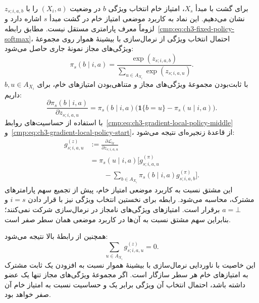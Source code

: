 برای گشت با مبدأ $X_s$، امتیاز خام انتخاب
ویژگی $b$ در وضعیت $(X_i,a)$ را با
$z_{s;i,a,b}$ نشان می‌دهیم. این نماد به
کاربرد موضعی امتیاز خام در گشت مبدأ $s$
اشاره دارد و لزوماً معرف پارامتری مستقل نیست.
مطابق رابطه~\eqref{cmp:eq:ch3-fixed-policy-softmax}،
احتمال انتخاب ویژگی از نرمال‌سازی با بیشینهٔ
هموار روی مجموعهٔ ویژگی‌های مجاز نمونهٔ جاری
حاصل می‌شود:
\[
\pi_s(b\mid i,a)=
\frac{\exp(z_{s;i,a,b})}
{\sum_{u\in A_{X_i}}\exp(z_{s;i,a,u})}.
\]
با ثابت‌بودن مجموعهٔ ویژگی‌های مجاز و
متناهی‌بودن امتیازهای خام، برای
$b,u\in A_{X_i}$ داریم:
\begin{equation}\label{cmp:eq:ch3-gradient-masked-softmax}
\frac{\partial\pi_s(b\mid i,a)}
{\partial z_{s;i,a,u}}
=\pi_s(b\mid i,a)
\bigl(\mathbf1\{b=u\}-\pi_s(u\mid i,a)\bigr).
\end{equation}
با استفاده از حساسیت‌های
روابط~\eqref{cmp:eq:ch3-gradient-local-policy-middle}
و~\eqref{cmp:eq:ch3-gradient-local-policy-start}،
از قاعدهٔ زنجیره‌ای نتیجه می‌شود:
\begin{equation}\label{cmp:eq:ch3-gradient-local-score}
\boxed{\begin{aligned}
g_{s;i,a,u}^{(z)}
&:=\frac{\partial\mathcal L_{\mathrm{tr}}}
{\partial z_{s;i,a,u}}\\
&=\pi_s(u\mid i,a)\Bigg[
g_{s;i,a,u}^{(\pi)}\\
&\qquad-\sum_{b\in A_{X_i}}
\pi_s(b\mid i,a)g_{s;i,a,b}^{(\pi)}
\Bigg].
\end{aligned}}
\end{equation}
این مشتق نسبت به کاربرد موضعی امتیاز خام،
پیش از تجمیع سهم پارامترهای مشترک، محاسبه
می‌شود. رابطه برای نخستین انتخاب ویژگی
نیز با قرار دادن $i=s$ و $a=\bot$ برقرار است.
امتیازهای ویژگی‌های نامجاز در نرمال‌سازی
شرکت نمی‌کنند؛ بنابراین سهم مشتق نسبت به
آن‌ها در کاربرد موضعی همان سطر صفر است.

همچنین از رابطهٔ بالا نتیجه می‌شود:
\begin{equation}\label{cmp:eq:ch3-gradient-local-score-zero-sum}
\boxed{\sum_{u\in A_{X_i}}g_{s;i,a,u}^{(z)}=0.}
\end{equation}
این خاصیت با ناوردایی نرمال‌سازی با بیشینهٔ
هموار نسبت به افزودن یک ثابت مشترک به
امتیازهای خام هر سطر سازگار است. اگر مجموعهٔ
ویژگی‌های مجاز تنها یک عضو داشته باشد،
احتمال انتخاب آن ویژگی برابر یک و حساسیت
نسبت به امتیاز خام آن صفر خواهد بود.

